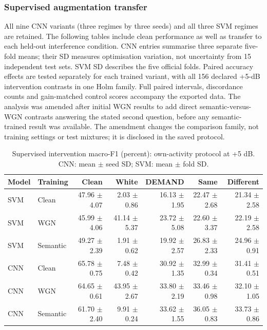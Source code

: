 \subsubsection*{Supervised augmentation transfer}
All nine CNN variants (three regimes by three seeds) and all three SVM regimes
are retained. The following tables include clean performance as well as transfer
to each held-out interference condition. CNN entries summarise three separate
five-fold means; their SD measures optimisation variation, not uncertainty from
15 independent test sets. SVM SD describes the five official folds. Paired
accuracy effects are tested separately for each trained variant, with all 156
declared +5-dB intervention contrasts in one Holm family. Full paired intervals,
discordance counts and gain-matched control scores accompany the exported data.
The analysis was amended after initial WGN results to add direct semantic-versus-
WGN contrasts answering the stated second question, before any semantic-trained
result was available. The amendment changes the comparison family, not training
settings or test mixtures; it is disclosed in the saved protocol.
\begin{table}[htbp]\centering\footnotesize
\caption{Supervised intervention macro-F1 (percent): own-activity protocol at +5 dB. CNN: mean $\pm$ seed SD; SVM: mean $\pm$ fold SD.}
\begin{tabular}{llrrrrr}\toprule Model & Training & Clean & White & DEMAND & Same & Different\\\midrule
SVM & Clean & 47.96 $\pm$ 4.07 & 2.03 $\pm$ 0.86 & 16.13 $\pm$ 1.95 & 22.47 $\pm$ 2.68 & 21.34 $\pm$ 2.58 \\
SVM & WGN & 45.99 $\pm$ 4.06 & 41.14 $\pm$ 5.37 & 23.72 $\pm$ 5.08 & 22.60 $\pm$ 3.37 & 22.19 $\pm$ 2.58 \\
SVM & Semantic & 49.27 $\pm$ 2.39 & 1.91 $\pm$ 0.62 & 19.92 $\pm$ 2.57 & 26.83 $\pm$ 2.33 & 24.96 $\pm$ 0.91 \\
\midrule
CNN & Clean & 65.78 $\pm$ 0.75 & 7.48 $\pm$ 0.42 & 30.92 $\pm$ 1.35 & 32.99 $\pm$ 0.34 & 31.41 $\pm$ 0.51 \\
CNN & WGN & 64.65 $\pm$ 0.61 & 43.95 $\pm$ 2.67 & 33.80 $\pm$ 2.19 & 33.46 $\pm$ 0.98 & 32.10 $\pm$ 1.05 \\
CNN & Semantic & 61.70 $\pm$ 2.40 & 9.91 $\pm$ 0.24 & 33.62 $\pm$ 1.55 & 36.05 $\pm$ 0.83 & 33.73 $\pm$ 0.86 \\
\bottomrule\end{tabular}\end{table}

